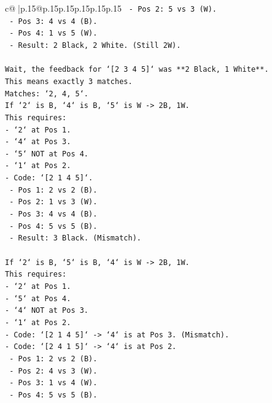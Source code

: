 \documentclass{article}
\begin{document}
{\begin{supertabular}{c@{$\;$}|p{.15\linewidth}@{}p{.15\linewidth}p{.15\linewidth}p{.15\linewidth}p{.15\linewidth}p{.15\linewidth}}
{{{\texttt{    {-} Pos 2: 5 vs 3 (W).} \\
\texttt{    {-} Pos 3: 4 vs 4 (B).} \\
\texttt{    {-} Pos 4: 1 vs 5 (W).} \\
\texttt{    {-} Result: 2 Black, 2 White. (Still 2W).} \\
\\ 
\texttt{Wait, the feedback for `{[}2 3 4 5{]}` was **2 Black, 1 White**.} \\
\texttt{This means exactly 3 matches.} \\
\texttt{Matches: `2, 4, 5`.} \\
\texttt{If `2` is B, `4` is B, `5` is W {-}> 2B, 1W.} \\
\texttt{This requires:} \\
\texttt{{-} `2` at Pos 1.} \\
\texttt{{-} `4` at Pos 3.} \\
\texttt{{-} `5` NOT at Pos 4.} \\
\texttt{{-} `1` at Pos 2.} \\
\texttt{{-} Code: `{[}2 1 4 5{]}`.} \\
\texttt{    {-} Pos 1: 2 vs 2 (B).} \\
\texttt{    {-} Pos 2: 1 vs 3 (W).} \\
\texttt{    {-} Pos 3: 4 vs 4 (B).} \\
\texttt{    {-} Pos 4: 5 vs 5 (B).} \\
\texttt{    {-} Result: 3 Black. (Mismatch).} \\
\\ 
\texttt{If `2` is B, `5` is B, `4` is W {-}> 2B, 1W.} \\
\texttt{This requires:} \\
\texttt{{-} `2` at Pos 1.} \\
\texttt{{-} `5` at Pos 4.} \\
\texttt{{-} `4` NOT at Pos 3.} \\
\texttt{{-} `1` at Pos 2.} \\
\texttt{{-} Code: `{[}2 1 4 5{]}` {-}> `4` is at Pos 3. (Mismatch).} \\
\texttt{{-} Code: `{[}2 4 1 5{]}` {-}> `4` is at Pos 2.} \\
\texttt{    {-} Pos 1: 2 vs 2 (B).} \\
\texttt{    {-} Pos 2: 4 vs 3 (W).} \\
\texttt{    {-} Pos 3: 1 vs 4 (W).} \\
\texttt{    {-} Pos 4: 5 vs 5 (B).} \\
}}}
\end{supertabular}}
\end{document}
